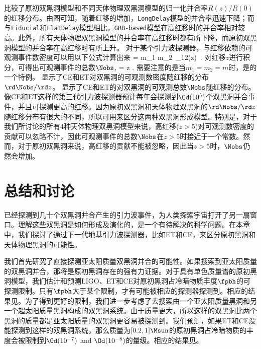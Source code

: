 比较了原初双黑洞模型和不同天体物理双黑洞模型的归一化并合率$R(z)/R(0)$的红移分布。由图可知，随着红移的增加，\texttt{LongDelay}模型的并合率迅速下降；而与\texttt{Fiducial}和\texttt{FlatDelay}模型相比，\texttt{GRB-based}模型在高红移时的并合率相对较高。此外，所有天体物理双黑洞模型的并合率在高红移时都有所下降，而原初双黑洞模型的并合率在高红移时有所上升。
对于某个引力波探测器，与红移依赖的可观测事件数密度可以用以下公式计算出来
\e\label{event_density} 
 = \int \rd m_1 \rd m_2\, \mR_{12}(z)\,
.
\q 
对红移$z$进行积分，可得出可观测事件的总数$\Nobs$,
\e\label{Nobs2} 
\Nobs = \int \rd z .
\q 
需要注意的是当$m_1 = m_2 = m$时，是的一个特例。
显示了CE和ET对双黑洞的可观测数密度随红移的分布$\rd \Nobs/\rd z$。
 显示了CE和ET的对双黑洞的可观测总数$\Nobs$随红移的分布。
像CE和ET这样的第三代引力波探测器预计每年会探测到$\Od(10^5)$个双黑洞并合事件，并且可探测更高的红移。因为原初双黑洞和天体物理双黑洞的$\rd \Nobs/\rd z$随红移分布有很大的不同，所以可用来区分这两种双黑洞形成模型。特别是，对于我们所讨论的所有$4$种天体物理双黑洞模型来说，高红移($z>5$)对可观测数密度的贡献可以忽略不计，因此可观测事件的总数$\Nobs$在$z>5$时接近于一个常数。然而，对于原初双黑洞来说，高红移的贡献不能被忽略，因此当$z>5$时，$\Nobs$仍然会增加。



\section{\label{discuss}总结和讨论}

\lvc 已经探测到几十个双黑洞并合产生的引力波事件，为人类探索宇宙打开了另一扇窗口。理解这些双黑洞是如何形成及演化的，是一个有待解决的科学问题。在本章中，我们探讨了通过下一代地基引力波探测器，比如ET和CE，来区分原初黑洞和天体物理黑洞的可能性。

我们首先研究了直接探测亚太阳质量双黑洞并合的可能性。如果搜索到亚太阳质量的双黑洞并合，那将是原初黑洞存在的强有力证据。对于具有单色质量谱的原初黑洞模型，我们估计和预测LIGO、ET和CE对原初黑洞占冷暗物质丰度$\fpbh$的可探测限制。只有$\fpbh$大于某个限制，才有可能被相应的探测器探测到。相应的结果见。为了得到更好的限制，我们进一步考虑了去搜索由一个亚太阳质量黑洞和另一个超太阳质量黑洞构成的双黑洞系统。由于质量更大，所以这样的双黑洞比两个黑洞的质量都是亚太阳质量的双黑洞更容易被探测到。我们预测，如果ET和CE没能探测到这样的双黑洞系统，那么质量为$[0.2, 1]\Msun$的原初黑洞占冷暗物质的丰度会被限制到$\Od(10^{-7})$ and $\Od(10^{-8})$的量级。相应的结果见。

